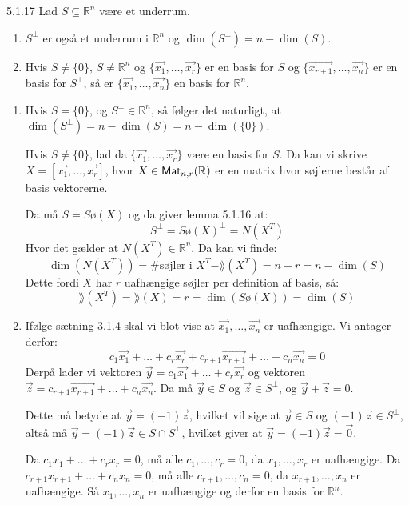 \begin{saetning}{5.1.17}
	Lad $S \subseteq \mathbb{R}^n$ være et underrum.
	\begin{enumerate}
		\item $S^\bot$ er også et underrum i $\mathbb{R}^n$ og $\dim(S^\bot) =
			n - \dim(S)$.
		\item Hvis $S \not= \{0\},\, S \not= \mathbb{R}^n$ og $\{\vec{x_1}, 
			\dotsc, \vec{x_r}\}$ er en basis for $S$ og $\{\vec{x_{r+1}}, 
			\dotsc, \vec{x_n}\}$ er en basis for $S^\bot$, så er $\{\vec{x_1}, 
			\dotsc, \vec{x_n}\}$ en basis for $\mathbb{R}^n$.
	\end{enumerate}
\end{saetning}

\begin{bevis}
	\begin{enumerate}
		\item Hvis $S = \{0\}$, og $S^\bot \in \mathbb{R}^n$, så følger det 
			naturligt, at $\dim(S^\bot) = n - \dim(S) = n - \dim(\{0\})$.

			Hvis $S \not= \{0\}$, lad da $\{\vec{x_1}, \dotsc, \vec{x_r}\}$ 
			være en basis for $S$. Da kan vi skrive $X = [\vec{x_1}, \dotsc, 
			\vec{x_r}]$, hvor $X \in \textsf{Mat}_{n,r}(\mathbb{R})$ er en matrix 
			hvor søjlerne består af basis vektorerne.

			Da må $S = S\text{ø}(X)$ og da giver lemma 5.1.16 at:
			\[
				S^\bot = S\text{ø}(X)^\bot = N(X^T)
			\]
			Hvor det gælder at $N(X^T) \in \mathbb{R}^n$. Da kan vi finde:
			\[
				\dim(N(X^T)) = \text{\#søjler i } X^T-\rang(X^T) = n-r = 
				n - \dim(S)
			\]
			Dette fordi $X$ har $r$ uafhængige søjler per definition af basis, 
			så:
			\[
				\rang(X^T) = \rang(X) = r = \dim(S\text{ø}(X)) = \dim(S)
			\]
		\item Ifølge \hyperlink{3.1.4}{sætning 3.1.4} skal vi blot vise at 
			$\vec{x_1}, \dotsc, \vec{x_n}$ er uafhængige.
			Vi antager derfor:
			\[
				c_1\vec{x_1} + \dotsc + c_r\vec{x_r} + c_{r+1}\vec{x_{r+1}} + 
				\dotsc + c_n\vec{x_n} = 0
			\]
			Derpå lader vi vektoren $\vec{y} = c_1\vec{x_1} + \dotsc + 
			c_r\vec{x_r}$ og vektoren $\vec{z} = c_{r+1}\vec{x_{r+1}} + 
			\dotsc + c_n\vec{x_n}$. Da må $\vec{y} \in S$ og $\vec{z} \in 
			S^\bot$, og $\vec{y} + \vec{z} = 0$.

			Dette må betyde at $\vec{y} = (-1)\vec{z}$, hvilket vil sige at 
			$\vec{y} \in S$ og $(-1)\vec{z} \in S^\bot$, altså må $\vec{y} = 
			(-1)\vec{z} \in S \cap S^\bot$, hvilket giver at $\vec{y} = 
			(-1)\vec{z} = \vec{0}$.

			Da $c_1x_1 + \dotsc + c_rx_r = 0$, må alle $c_1, \dotsc, c_r = 0$,
			da $x_1, \dotsc, x_r$ er uafhængige. Da $c_{r+1}x_{r+1} + \dotsc + 
			c_nx_n = 0$, må alle $c_{r+1}, \dotsc, c_n = 0$, da $x_{r+1}, 
			\dotsc, x_n$ er uafhængige. Så $x_1, \dotsc, x_n$ er uafhængige og
			derfor en basis for $\mathbb{R}^n$.
	\end{enumerate}
\end{bevis}
